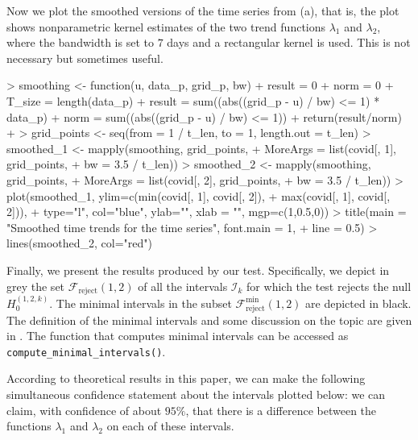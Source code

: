 \documentclass[a4paper]{article}
\begin{document}
Now we plot the smoothed versions of the time series from (a), that is, the plot shows nonparametric kernel estimates of the two trend functions $\lambda_1$ and $\lambda_2$, where the bandwidth is set to $7$ days and a rectangular kernel is used. This is not necessary but sometimes useful.
\begin{Schunk}
\begin{Sinput}
> smoothing <- function(u, data_p, grid_p, bw){
+   result      = 0
+   norm        = 0
+   T_size      = length(data_p)
+   result = sum((abs((grid_p - u) / bw) <= 1) * data_p)
+   norm = sum((abs((grid_p - u) / bw) <= 1))
+   return(result/norm)
+ }
> grid_points <- seq(from = 1 / t_len, to = 1, length.out = t_len)
> smoothed_1  <- mapply(smoothing, grid_points,
+                       MoreArgs = list(covid[, 1], grid_points,
+                                       bw = 3.5 / t_len))
> smoothed_2  <- mapply(smoothing, grid_points,
+                       MoreArgs = list(covid[, 2], grid_points,
+                                       bw = 3.5 / t_len))
> plot(smoothed_1, ylim=c(min(covid[, 1], covid[, 2]),
+                         max(covid[, 1], covid[, 2])),
+      type="l", col="blue", ylab="", xlab = "", mgp=c(1,0.5,0))
> title(main = "Smoothed time trends for the time series", font.main = 1,
+       line = 0.5)
> lines(smoothed_2, col="red")
\end{Sinput}
\end{Schunk}

Finally, we present the results produced by our test. Specifically, we depict in grey the set $\mathcal{F}_{\text{reject}}(1,2)$ of all the intervals $\mathcal{I}_k$ for which the test rejects the null $H_0^{(1, 2, k)}$. The minimal intervals in the subset $\mathcal{F}_{\text{reject}}^{\text{min}}(1, 2)$ are depicted in black. The definition of the minimal intervals and some discussion on the topic are given in \cite{KhismatullinaVogt2023}. The function that computes minimal intervals can be accessed as \verb|compute_minimal_intervals()|.

According to theoretical results in this paper, we can make the following simultaneous confidence statement about the intervals plotted below: we can claim, with confidence of about $95\%$, that there is a difference between the functions $\lambda_1$ and $\lambda_2$ on each of these intervals.
\end{document}
